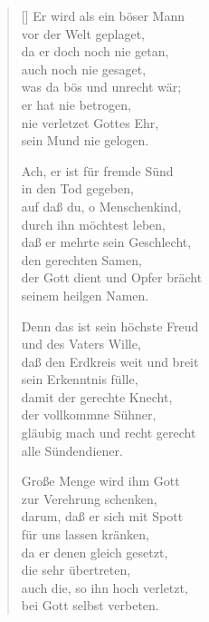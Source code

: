 \begin{multicols}{2}
\begin{verse}[\versewidth]
 Er wird als ein böser Mann\\
vor der Welt geplaget,\\
da er doch noch nie getan,\\
auch noch nie gesaget,\\
was da bös und unrecht wär;\\
er hat nie betrogen,\\
nie verletzet Gottes Ehr,\\
sein Mund nie gelogen.

 Ach, er ist für fremde Sünd\\
in den Tod gegeben,\\
auf daß du, o Menschenkind,\\
durch ihn möchtest leben,\\
daß er mehrte sein Geschlecht,\\
den gerechten Samen,\\
der Gott dient und Opfer brächt\\
seinem heilgen Namen.

 Denn das ist sein höchste Freud\\
und des Vaters Wille,\\
daß den Erdkreis weit und breit\\
sein Erkenntnis fülle,\\
damit der gerechte Knecht,\\
der vollkommne Sühner,\\
gläubig mach und recht gerecht\\
alle Sündendiener.

 Große Menge wird ihm Gott\\
zur Verehrung schenken,\\
darum, daß er sich mit Spott\\
für uns lassen kränken,\\
da er denen gleich gesetzt,\\
die sehr übertreten,\\
auch die, so ihn hoch verletzt,\\
bei Gott selbst verbeten.

\end{verse}
\end{multicols}
